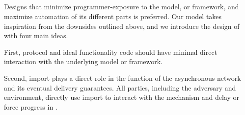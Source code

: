 %

\subsection{\fwrapper}
Designs that minimize programmer-exposure to the model, or framework, and
maximize automation of its different parts is preferred.  Our model takes
inspiration from the downsides outlined above, and we introduce the design of
\fwrapper with four main ideas.

First, protocol and ideal functionality code should have minimal direct
interaction with the underlying model or framework.

Second, import plays a direct role in the function of the asynchronous network
and its eventual delivery guarantees.  All parties, including the adversary and
environment, directly use import to interact with the mechanism and delay or
force progress in \fwrapper.  


